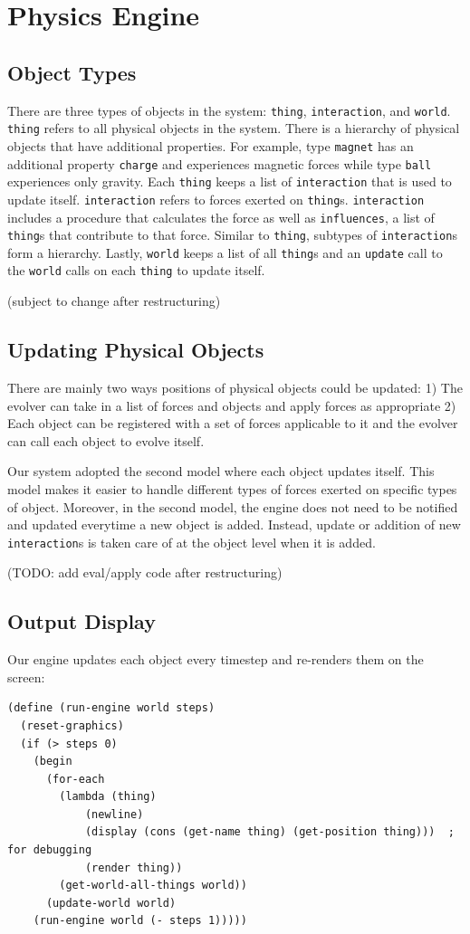 \documentclass{article}
\begin{document}
\section{Physics Engine}
\subsection{Object Types}
There are three types of objects in the system: \texttt{thing}, \texttt{interaction}, and \texttt{world}. \texttt{thing} refers to all physical objects in the system. There is a hierarchy of physical objects that have additional properties. For example, type \texttt{magnet} has an additional property \texttt{charge} and experiences magnetic forces while type \texttt{ball} experiences only gravity. Each \texttt{thing} keeps a list of \texttt{interaction} that is used to update itself. \texttt{interaction} refers to forces exerted on \texttt{thing}s. \texttt{interaction} includes a procedure that calculates the force as well as \texttt{influences}, a list of \texttt{thing}s that contribute to that force. Similar to \texttt{thing}, subtypes of \texttt{interaction}s form a hierarchy. Lastly, \texttt{world} keeps a list of all \texttt{thing}s and an \texttt{update} call to the \texttt{world} calls on each \texttt{thing} to update itself.

(subject to change after restructuring)

\subsection{Updating Physical Objects}
There are mainly two ways positions of physical objects could be updated: 1) The evolver can take in a list of forces and objects and apply forces as appropriate 2) Each object can be registered with a set of forces applicable to it and the evolver can call each object to evolve itself.

Our system adopted the second model where each object updates itself. This model makes it easier to handle different types of forces exerted on specific types of object. Moreover, in the second model, the engine does not need to be notified and updated everytime a new object is added. Instead, update or addition of new \texttt{interaction}s is taken care of at the object level when it is added.

(TODO: add eval/apply code after restructuring)

\subsection{Output Display}
Our engine updates each object every timestep and re-renders them on the screen:
\begin{verbatim}
(define (run-engine world steps)
  (reset-graphics)
  (if (> steps 0)
    (begin 
      (for-each 
        (lambda (thing)
            (newline)
            (display (cons (get-name thing) (get-position thing)))  ; for debugging
            (render thing))
        (get-world-all-things world))
      (update-world world)
    (run-engine world (- steps 1)))))
\end{verbatim}
\end{document}
